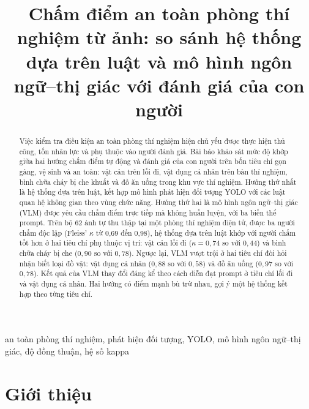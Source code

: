 \documentclass[conference]{IEEEtran}
\begin{document}
\title{Chấm điểm an toàn phòng thí nghiệm từ ảnh: so sánh hệ thống dựa trên luật và mô hình ngôn ngữ--thị giác với đánh giá của con người}

\author{
}

\maketitle

\begin{abstract}
Việc kiểm tra điều kiện an toàn phòng thí nghiệm hiện chủ yếu được thực hiện thủ công, tốn nhân lực và phụ thuộc vào người đánh giá. Bài báo khảo sát mức độ khớp giữa hai hướng chấm điểm tự động và đánh giá của con người trên bốn tiêu chí gọn gàng, vệ sinh và an toàn: vật cản trên lối đi, vật dụng cá nhân trên bàn thí nghiệm, bình chữa cháy bị che khuất và đồ ăn uống trong khu vực thí nghiệm. Hướng thứ nhất là hệ thống dựa trên luật, kết hợp mô hình phát hiện đối tượng YOLO với các luật quan hệ không gian theo vùng chức năng. Hướng thứ hai là mô hình ngôn ngữ--thị giác (VLM) được yêu cầu chấm điểm trực tiếp mà không huấn luyện, với ba biến thể prompt. Trên bộ 62 ảnh tự thu thập tại một phòng thí nghiệm điện tử, được ba người chấm độc lập (Fleiss' $\kappa$ từ 0{,}69 đến 0{,}98), hệ thống dựa trên luật khớp với người chấm tốt hơn ở hai tiêu chí phụ thuộc vị trí: vật cản lối đi ($\kappa = 0{,}74$ so với $0{,}44$) và bình chữa cháy bị che ($0{,}90$ so với $0{,}78$). Ngược lại, VLM vượt trội ở hai tiêu chí đòi hỏi nhận biết loại đồ vật: vật dụng cá nhân ($0{,}88$ so với $0{,}58$) và đồ ăn uống ($0{,}97$ so với $0{,}78$). Kết quả của VLM thay đổi đáng kể theo cách diễn đạt prompt ở tiêu chí lối đi và vật dụng cá nhân. Hai hướng có điểm mạnh bù trừ nhau, gợi ý một hệ thống kết hợp theo từng tiêu chí.
\end{abstract}

\begin{IEEEkeywords}
an toàn phòng thí nghiệm, phát hiện đối tượng, YOLO, mô hình ngôn ngữ--thị giác, độ đồng thuận, hệ số kappa
\end{IEEEkeywords}

\section{Giới thiệu}
\end{document}
